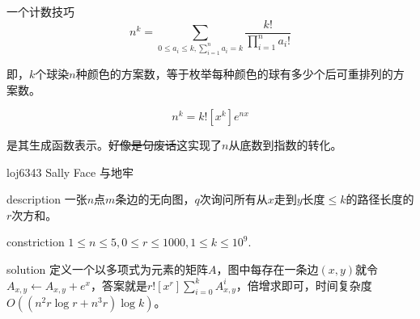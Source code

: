 \documentclass{beamer}
\begin{document}
	\begin{frame}{一个计数技巧}
		$$n^k=\sum_{0 \le a_i \le k, \sum_{i=1}^na_i = k}\frac{k!}{\prod_{i=1}^na_i!}$$
		
		即，$k$个球染$n$种颜色的方案数，等于枚举每种颜色的球有多少个后可重排列的方案数。
		
		$$n^k=k![x^k]e^{nx}$$
		
		是其生成函数表示。\sout{好像是句废话}这实现了$n$从底数到指数的转化。
	\end{frame}
	\begin{frame}{loj6343 Sally Face 与地牢}
		\begin{block}{description}
			一张$n$点$m$条边的无向图，$q$次询问所有从$x$走到$y$长度$\le k$的路径长度的$r$次方和。
		\end{block}
		\begin{block}{constriction}
			$1 \le n \le 5, 0 \le r \le 1000, 1\le k \le 10^9.$
		\end{block}
		\pause
		\begin{block}{solution}
			定义一个以多项式为元素的矩阵$A$，图中每存在一条边$(x,y)$就令$A_{x,y} \gets A_{x,y} +e^x$，答案就是$r![x^r]\sum_{i=0}^kA^i_{x,y}$，倍增求即可，时间复杂度$O((n^2r\log r+n^3r)\log k)$。
		\end{block}
	\end{frame}
\end{document}
